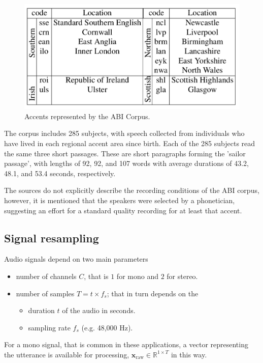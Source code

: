\documentclass[conference]{IEEEtran}
\begin{document}
\begin{figure}[H]
	\centering
	\includegraphics[width=0.7\linewidth]{img/img-abi-corpus-accents}
	\caption{Accents represented by the ABI Corpus\cite{najafian2016improving}.}
	\label{fig:img-abi-corpus-accents}
\end{figure}

The corpus includes 285 subjects, with speech collected from individuals who have lived in each regional accent area since birth. Each of the 285 subjects read the same three short passages. These are short paragraphs forming the 'sailor passage', with lengths of 92, 92, and 107 words with average durations of 43.2, 48.1, and 53.4 seconds, respectively\cite{najafian2016improving}.

The sources do not explicitly describe the recording conditions of the ABI corpus, however, it is mentioned that the speakers were selected by a phonetician, suggesting an effort for a standard quality recording for at least that accent\cite{najafian2016improving}.

\subsection{Signal resampling}
\label{ssec:signal-resampling}

Audio signals depend on two main parameters

\begin{itemize}
	\item number of channels $C$, that is $1$ for mono and $2$ for stereo.
	\item number of samples $T = t \times f_s$; that in turn depends on the
	\begin{itemize}
		\item duration $t$ of the audio in seconds.
		\item sampling rate $f_s$ (e.g. 48,000 Hz).
	\end{itemize}
	
\end{itemize}

For a mono signal, that is common in these applications, a vector representing the utterance is available for processing,  $\mathbf{x}_{\text{raw}} \in \mathbb{R}^{1 \times T}$ in this way.
\end{document}
